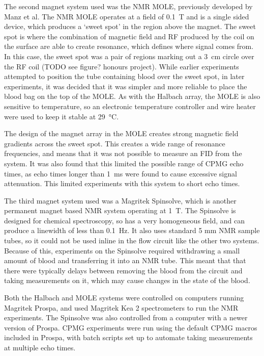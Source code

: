 The second magnet system used was the NMR MOLE, previously developed by Manz et al\cite{ManzmobileonesidedNMR2006}.
The NMR MOLE operates at a field of \SI{0.1}{T} and is a single sided device, which produces a `sweet spot' in the region above the magnet.
The sweet spot is where the combination of magnetic field and RF produced by the coil on the surface are able to create resonance, which defines where signal comes from.
In this case, the sweet spot was a pair of regions marking out a \SI{3}{cm} circle over the RF coil (TODO see figure? honours project).
While earlier experiments attempted to position the tube containing blood over the sweet spot, in later experiments, it was decided that it was simpler and more reliable to place the blood bag on the top of the MOLE.
As with the Halbach array, the MOLE is also sensitive to temperature, so an electronic temperature controller and wire heater were used to keep it stable at \SI{29}{\celsius}.

The design of the magnet array in the MOLE creates strong magnetic field gradients across the sweet spot.
This creates a wide range of resonance frequencies, and means that it was not possible to measure an FID from the system.
It was also found that this limited the possible range of CPMG echo times, as echo times longer than \SI{1}{ms} were found to cause excessive signal attenuation.
This limited experiments with this system to short echo times.

The third magnet system used was a Magritek Spinsolve, which is another permanent magnet based NMR system operating at \SI{1}{T}.
The Spinsolve is designed for chemical spectroscopy, so has a very homogeneous field, and can produce a linewidth of less than \SI{0.1}{Hz}.
It also uses standard 5 mm NMR sample tubes, so it could not be used inline in the flow circuit like the other two systems.
Because of this, experiments on the Spinsolve required withdrawing a small amount of blood and transferring it into an NMR tube.
This meant that that there were typically delays between removing the blood from the circuit and taking measurements on it, which may cause changes in the state of the blood.

Both the Halbach and MOLE systems were controlled on computers running Magritek Prospa, and used Magritek Kea 2 spectrometers to run the NMR experiments.
The Spinsolve was also controlled from a computer with a newer version of Prospa.
CPMG experiments were run using the default CPMG macros included in Prospa, with batch scripts set up to automate taking measurements at multiple echo times.

